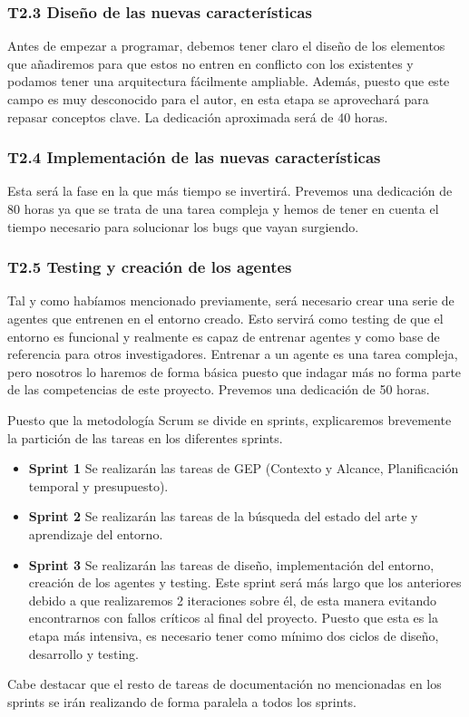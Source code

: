\subsubsection*{T2.3 Diseño de las nuevas características}
Antes de empezar a programar, debemos tener claro el diseño de los elementos que añadiremos para que estos no entren en conflicto con los existentes y podamos tener una arquitectura fácilmente ampliable. Además, puesto que este campo es muy desconocido para el autor, en esta etapa se aprovechará para repasar conceptos clave. La dedicación aproximada será de 40 horas.

\subsubsection*{T2.4 Implementación de las nuevas características}
Esta será la fase en la que más tiempo se invertirá. Prevemos una dedicación de 80 horas ya que se trata de una tarea compleja y hemos de tener en cuenta el tiempo necesario para solucionar los bugs que vayan surgiendo.

\subsubsection*{T2.5 Testing y creación de los agentes}
Tal y como habíamos mencionado previamente, será necesario crear una serie de agentes que entrenen en el entorno creado. Esto servirá como testing de que el entorno es funcional y realmente es capaz de entrenar agentes y como base de referencia para otros investigadores. Entrenar a un agente es una tarea compleja, pero nosotros lo haremos de forma básica puesto que indagar más no forma parte de las competencias de este proyecto. Prevemos una dedicación de 50 horas.  

Puesto que la metodología Scrum se divide en sprints, explicaremos brevemente la partición de las tareas en los diferentes sprints.
\begin{itemize}
    \item \textbf{Sprint 1} Se realizarán las tareas de GEP (Contexto y Alcance, Planificación temporal y presupuesto).
    \item \textbf{Sprint 2} Se realizarán las tareas de la búsqueda del estado del arte y aprendizaje del entorno.
    \item \textbf{Sprint 3} Se realizarán las tareas de diseño, implementación del entorno, creación de los agentes y testing. Este sprint será más largo que los anteriores debido a que realizaremos 2 iteraciones sobre él, de esta manera evitando encontrarnos con fallos críticos al final del proyecto. Puesto que esta es la etapa más intensiva, es necesario tener como mínimo dos ciclos de diseño, desarrollo y testing. 
\end{itemize}
Cabe destacar que el resto de tareas de documentación no mencionadas en los sprints se irán realizando de forma paralela a todos los sprints.

